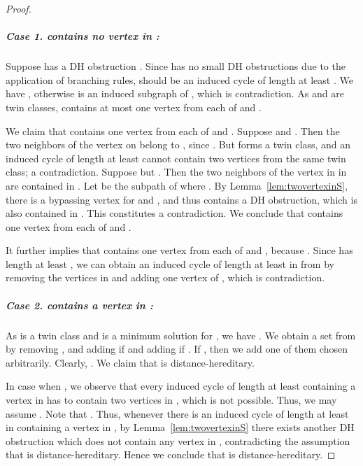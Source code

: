 \documentclass[11pt]{elsarticle}
\begin{document}
\begin{proof}
\subparagraph{\textbf{Case 1.}  contains no vertex in :}  
Suppose  has a DH obstruction . Since  has no small DH obstructions due to the application of branching rules,  should be an induced cycle of length at least .
We have , otherwise  is an induced subgraph of , which is contradiction.
As  and  are twin classes,  contains at most one vertex from each of  and .

We claim that  contains one vertex from each of  and .
Suppose  and . Then the two neighbors of the vertex on  belong to , 
since . But  forms a twin class, and an induced cycle of length at least  cannot contain two vertices from the same twin class; a contradiction.
Suppose  but .  
Then the two neighbors of the vertex  in  in  are contained in .
Let  be the subpath of  where .
By Lemma~\ref{lem:twovertexinS}, there is a bypassing vertex for  and , and thus  contains a DH obstruction, which is also contained in .
This constitutes a contradiction. We conclude that  contains one vertex from each of  and .




 It further implies that  contains one vertex from each of  and , because . 
Since  has length at least , we can obtain an induced cycle of length at least  in  from  by removing the vertices in  and adding one vertex of , which is contradiction.

\subparagraph{\textbf{Case 2.}  contains a vertex in :}  
As  is a twin class and  is a minimum solution for , we have .
We obtain a set  from  by removing , and adding  if  and adding  if . If , then we add one of them chosen arbitrarily.
Clearly, .
We claim that  is distance-hereditary.

In case when , we observe that every induced cycle of length at least  containing a vertex in  has to contain two vertices in , which is not possible.
Thus, we may assume .
Note that . Thus, whenever there is an induced cycle of length at least  in  containing a vertex in , by Lemma~\ref{lem:twovertexinS} there exists another DH obstruction which does not contain any vertex in , contradicting the assumption that  is distance-hereditary.
Hence we conclude that  is distance-hereditary.
\end{proof}
\end{document}
